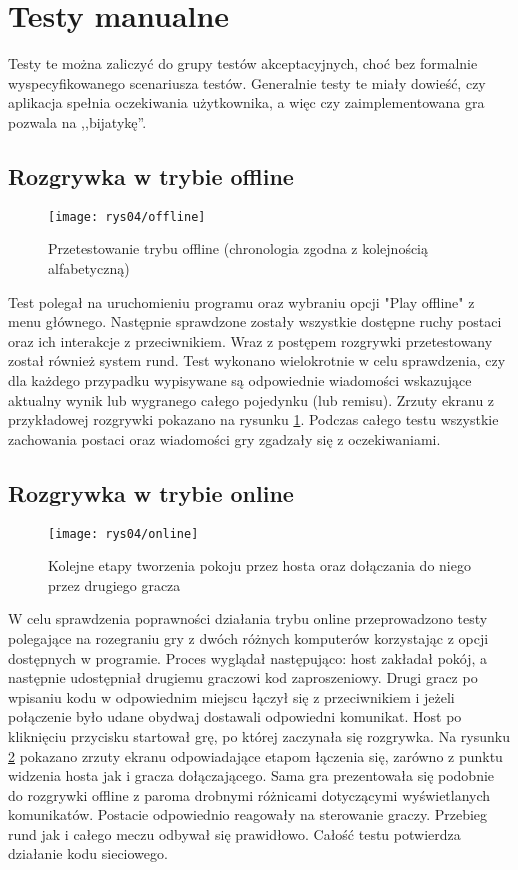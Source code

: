 \section{Testy manualne}
Testy te można zaliczyć do grupy testów akceptacyjnych, choć bez formalnie wyspecyfikowanego scenariusza testów. Generalnie testy te miały dowieść, czy aplikacja spełnia oczekiwania użytkownika, a więc czy zaimplementowana gra pozwala na ,,bijatykę''.
\subsection{Rozgrywka w trybie offline}
\begin{figure}[htb]
	\centering
		\texttt{[image: rys04/offline]}
	\caption{Przetestowanie trybu offline (chronologia zgodna z kolejnością alfabetyczną)}
	\label{fig:offline}
\end{figure}
Test polegał na uruchomieniu programu oraz wybraniu opcji "Play offline" z menu głównego. Następnie sprawdzone zostały wszystkie dostępne ruchy postaci oraz ich interakcje z przeciwnikiem. Wraz z postępem rozgrywki przetestowany został również system rund.  Test wykonano wielokrotnie w celu sprawdzenia, czy dla każdego przypadku wypisywane są odpowiednie wiadomości wskazujące aktualny wynik lub wygranego całego pojedynku (lub remisu). Zrzuty ekranu z przykładowej rozgrywki pokazano na rysunku \ref{fig:offline}. Podczas całego testu wszystkie zachowania postaci oraz wiadomości gry zgadzały się z oczekiwaniami.

\subsection{Rozgrywka w trybie online}
\begin{figure}[htb]
	\centering
		\texttt{[image: rys04/online]}
	\caption{Kolejne etapy tworzenia pokoju przez hosta oraz dołączania do niego przez drugiego gracza}
	\label{fig:online}
\end{figure}
W celu sprawdzenia poprawności działania trybu online przeprowadzono testy polegające na rozegraniu gry z dwóch różnych komputerów korzystając z opcji dostępnych w programie. Proces wyglądał następująco: host zakładał pokój, a następnie udostępniał drugiemu graczowi kod zaproszeniowy. Drugi gracz po wpisaniu kodu w odpowiednim miejscu łączył się z przeciwnikiem i jeżeli połączenie było udane obydwaj dostawali odpowiedni komunikat. Host po kliknięciu przycisku startował grę, po której zaczynała się rozgrywka. Na rysunku \ref{fig:online} pokazano zrzuty ekranu odpowiadające etapom łączenia się, zarówno z punktu widzenia hosta jak i gracza dołączającego. Sama gra prezentowała się podobnie do rozgrywki offline z paroma drobnymi różnicami dotyczącymi wyświetlanych komunikatów. Postacie odpowiednio reagowały na sterowanie graczy. Przebieg rund jak i całego meczu odbywał się prawidłowo. Całość testu potwierdza działanie kodu sieciowego.



